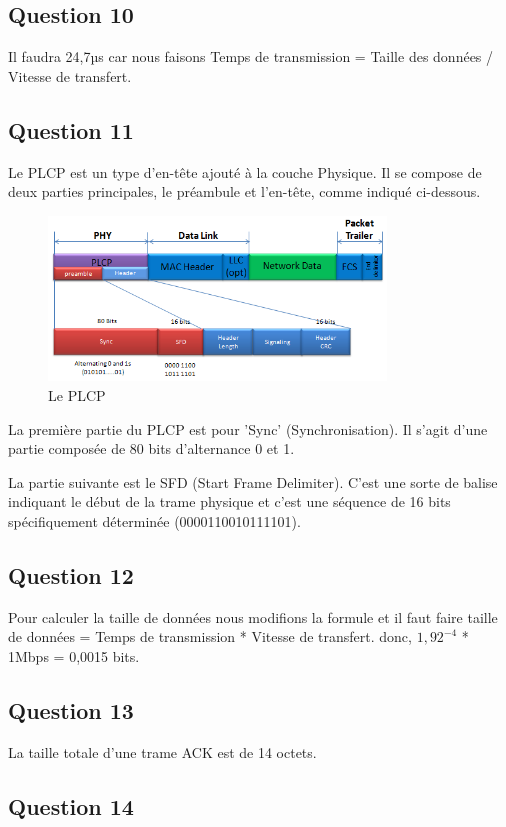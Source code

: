 \documentclass[12pt, a4paper]{article}
\begin{document}
\subsection{Question 10}
Il faudra 24,7µs car nous faisons Temps de transmission = Taille des données / Vitesse de transfert.
\newpage 

\subsection{Question 11}
Le PLCP est un type d'en-tête ajouté à la couche Physique. Il se 
compose de deux parties principales, le préambule et l'en-tête, 
comme indiqué ci-dessous.

\begin{figure}[H]
    \centering
    \includegraphics[width=0.8\textwidth]{../img/td.png}
    \caption{Le PLCP}
    \label{fig:td}
\end{figure}

La première partie du PLCP est pour 'Sync' (Synchronisation). Il 
s'agit d'une partie composée de 80 bits d'alternance 0 et 1.

La partie suivante est le SFD (Start Frame Delimiter). C'est 
une sorte de balise indiquant le début de la trame physique et 
c'est une séquence de 16 bits spécifiquement déterminée (0000110010111101).

\subsection{Question 12}
Pour calculer la taille de données nous modifions la formule et il faut faire 
taille de données = Temps de transmission * Vitesse de transfert.
donc, $ 1,92^{-4} $ * 1Mbps = 0,0015 bits. 

\subsection{Question 13}
La taille totale d'une trame ACK est de 14 octets.

\subsection{Question 14}
\end{document}
